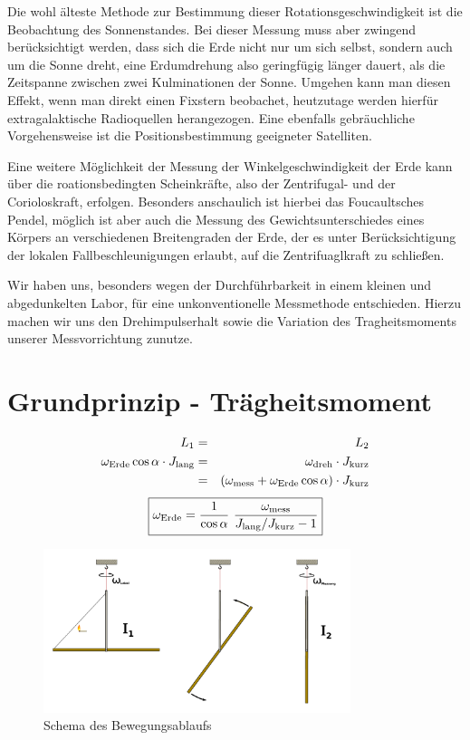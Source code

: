 \documentclass[11pt]{scrartcl}
\newcommand{\ltext}[1]{\ensuremath{_{\textnormal{#1}}}}
\begin{document}
Die wohl älteste Methode zur Bestimmung dieser Rotationsgeschwindigkeit ist die Beobachtung des Sonnenstandes.
Bei dieser Messung muss aber zwingend berücksichtigt werden, dass sich die Erde nicht nur um sich selbst, sondern auch um die Sonne dreht, eine Erdumdrehung also geringfügig länger dauert, als die Zeitspanne zwischen zwei Kulminationen der Sonne. Umgehen kann man diesen Effekt, wenn man direkt einen Fixstern beobachet, heutzutage werden hierfür extragalaktische Radioquellen herangezogen. Eine ebenfalls gebräuchliche Vorgehensweise ist die Positionsbestimmung geeigneter Satelliten.

Eine weitere Möglichkeit der Messung der Winkelgeschwindigkeit der Erde kann über die roationsbedingten Scheinkräfte, also der Zentrifugal- und der Corioloskraft, erfolgen. Besonders anschaulich ist hierbei das Foucaultsches Pendel, möglich ist aber auch die Messung des Gewichtsunterschiedes eines Körpers an verschiedenen Breitengraden der Erde, der es unter Berücksichtigung der lokalen Fallbeschleunigungen erlaubt, auf die Zentrifuaglkraft zu schließen. 

Wir haben uns, besonders wegen der Durchführbarkeit in einem kleinen und abgedunkelten Labor, für eine unkonventionelle Messmethode entschieden. Hierzu machen wir uns den Drehimpulserhalt sowie die Variation des Tragheitsmoments unserer Messvorrichtung zunutze.

\section{Grundprinzip - Tr\"agheitsmoment}
\begin{eqnarray}
L_1 &=& L_2 \\
\omega\ltext{Erde}\cos\alpha \cdot J\ltext{lang} &=&
\omega\ltext{dreh} \cdot J\ltext{kurz} \\
&=& (\omega\ltext{mess} + \omega\ltext{Erde}\cos\alpha) \cdot J\ltext{kurz}
\end{eqnarray}
\begin{equation}
\boxed{
\omega\ltext{Erde} =
\frac{1}{\cos\alpha}\ 
\frac{\omega\ltext{mess}}{J\ltext{lang} / J\ltext{kurz} - 1}
}
\end{equation}

\begin{figure}[ht]
\begin{center}
\includegraphics[width=0.8\textwidth]{prinzip.pdf}
\end{center}
\vspace{-1.5\baselineskip}
\caption{Schema des Bewegungsablaufs}
\label{prinzip}
\end{figure}
\end{document}
